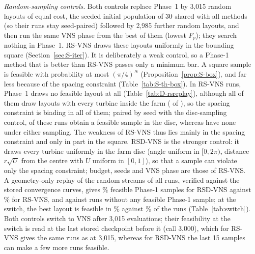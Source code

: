 \documentclass[10pt]{article}
\begin{document}
\emph{Random-sampling controls.} Both controls replace Phase~1 by 3,015 random layouts of equal cost, the seeded initial population of 30 shared with all methods (so their runs stay seed-paired) followed by 2,985 further random layouts, and then run the same VNS phase from the best of them (lowest $F_p$); they search nothing in Phase~1. RS-VNS draws these layouts uniformly in the bounding square (Section~\ref{sec:S-iter}). It is deliberately a weak control, so a Phase-1 method that is better than RS-VNS passes only a minimum bar. A square sample is feasible with probability at most $(\pi/4)^N$ (Proposition~\ref{prop:S-box}), and far less because of the spacing constraint (Table~\ref{tab:S-th-box}). In \NRSRunsNoFeasSample{} RS-VNS runs, Phase~1 draws no feasible layout at all (Table~\ref{tab:D-rsreplay}), although all of them draw layouts with every turbine inside the farm (\NRsNoFeasInside{} of \NRSRunsNoFeasSample), so the spacing constraint is binding in all of them; paired by seed with the disc-sampling control, \NRsSquareExplains{} of these runs obtain a feasible sample in the disc, whereas \NRsSpacingDominates{} have none under either sampling. The weakness of RS-VNS thus lies mainly in the spacing constraint and only in part in the square. %
 RSD-VNS is the stronger control: it draws every turbine uniformly in the farm disc (angle uniform in $[0,2\pi)$, distance $r\sqrt{U}$ from the centre with $U$ uniform in $[0,1]$), so that a sample can violate only the spacing constraint; budget, seeds and VNS phase are those of RS-VNS. A geometry-only replay of the random streams of all runs, verified against the stored convergence curves, gives \NRSDPctFeasSamples\% feasible Phase-1 samples for RSD-VNS against \NRSPctFeasSamples\% for RS-VNS, and \NRSDRunsNoFeasSample{} against \NRSRunsNoFeasSample{} runs without any feasible Phase-1 sample; at the switch, the best layout is feasible in \NSwitchFeasRSDVNS\% against \NSwitchFeasRSVNS\% of the runs (Table~\ref{tab:switch}). Both controls switch to VNS after 3,015 evaluations; their feasibility at the switch is read at the last stored checkpoint before it (call 3,000), which for RS-VNS gives the same runs as at 3,015, whereas for RSD-VNS the last 15 samples can make a few more runs feasible. %
\end{document}
